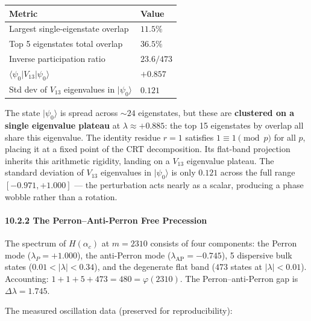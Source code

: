 \documentclass[11pt,letterpaper]{article}
\theoremstyle{definition}
\theoremstyle{remark}
\begin{document}
\begin{longtable}[]{@{}ll@{}}
\toprule
Metric & Value \\
\midrule
\endhead
\bottomrule
Largest single-eigenstate overlap & $11.5\%$ \\
Top 5 eigenstates total overlap & $36.5\%$ \\
Inverse participation ratio & $23.6 / 473$ \\
$\langle \psi_0 \lvert V_{13} \rvert \psi_0 \rangle$ & $+0.857$ \\
Std dev of $V_{13}$ eigenvalues in $\lvert\psi_0\rangle$ & $0.121$ \\
\end{longtable}

The state $|\psi_0\rangle$ is spread across $\sim 24$ eigenstates, but these are \textbf{clustered on a single eigenvalue plateau} at $\lambda \approx +0.885$: the top 15 eigenstates by overlap all share this eigenvalue. The identity residue $r = 1$ satisfies $1 \equiv 1 \pmod{p}$ for all $p$, placing it at a fixed point of the CRT decomposition. Its flat-band projection inherits this arithmetic rigidity, landing on a $V_{13}$ eigenvalue plateau. The standard deviation of $V_{13}$ eigenvalues in $|\psi_0\rangle$ is only $0.121$ across the full range $[-0.971, +1.000]$ --- the perturbation acts nearly as a scalar, producing a phase wobble rather than a rotation.

\paragraph{10.2.2 The Perron--Anti-Perron Free Precession}\label{the-perronanti-perron-free-precession}

The spectrum of $H(\alpha_c)$ at $m = 2310$ consists of four components: the Perron mode ($\lambda_P = +1.000$), the anti-Perron mode ($\lambda_{\text{AP}} = -0.745$), 5 dispersive bulk states ($0.01 < |\lambda| < 0.34$), and the degenerate flat band ($473$ states at $|\lambda| < 0.01$). Accounting: $1 + 1 + 5 + 473 = 480 = \varphi(2310)$. The Perron--anti-Perron gap is $\Delta\lambda = 1.745$.

The measured oscillation data (preserved for reproducibility):
\end{document}
